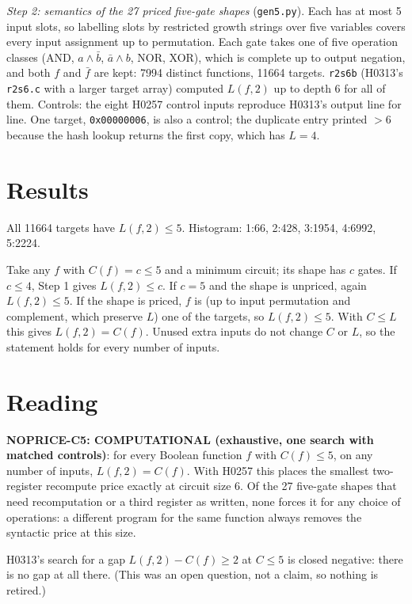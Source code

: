\documentclass[11pt]{article}
\begin{document}
\emph{Step 2: semantics of the 27 priced five-gate shapes} (\texttt{gen5.py}). Each has at most 5 input slots, so labelling slots by restricted growth strings over five variables covers every input assignment up to permutation. Each gate takes one of five operation classes (AND, $a\wedge\bar b$, $\bar a\wedge b$, NOR, XOR), which is complete up to output negation, and both $f$ and $\bar f$ are kept: 7994 distinct functions, 11664 targets. \texttt{r2s6b} (H0313's \texttt{r2s6.c} with a larger target array) computed $L(f,2)$ up to depth 6 for all of them. Controls: the eight H0257 control inputs reproduce H0313's output line for line. One target, \texttt{0x00000006}, is also a control; the duplicate entry printed $>6$ because the hash lookup returns the first copy, which has $L=4$.

\section*{Results}
All 11664 targets have $L(f,2)\le5$. Histogram: 1:66, 2:428, 3:1954, 4:6992, 5:2224.

Take any $f$ with $C(f)=c\le5$ and a minimum circuit; its shape has $c$ gates. If $c\le4$, Step 1 gives $L(f,2)\le c$. If $c=5$ and the shape is unpriced, again $L(f,2)\le5$. If the shape is priced, $f$ is (up to input permutation and complement, which preserve $L$) one of the targets, so $L(f,2)\le5$. With $C\le L$ this gives $L(f,2)=C(f)$. Unused extra inputs do not change $C$ or $L$, so the statement holds for every number of inputs.

\section*{Reading}
\textbf{NOPRICE-C5: COMPUTATIONAL (exhaustive, one search with matched controls)}: for every Boolean function $f$ with $C(f)\le5$, on any number of inputs, $L(f,2)=C(f)$. With H0257 this places the smallest two-register recompute price exactly at circuit size 6. Of the 27 five-gate shapes that need recomputation or a third register as written, none forces it for any choice of operations: a different program for the same function always removes the syntactic price at this size.

H0313's search for a gap $L(f,2)-C(f)\ge2$ at $C\le5$ is closed negative: there is no gap at all there. (This was an open question, not a claim, so nothing is retired.)
\end{document}
